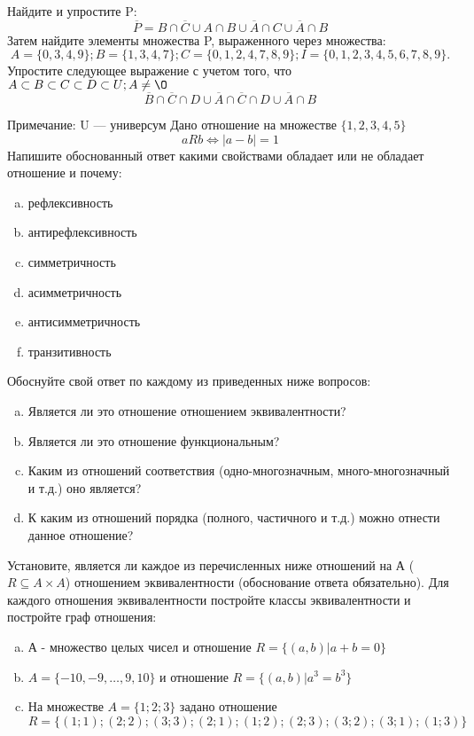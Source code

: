 \documentclass[10pt]{exam}
\begin{document}
\begin{questions}
\question
Найдите и упростите P:
\begin{equation*}
\overline{P} = B \cap \overline{C} \cup A \cap B \cup \overline{A} \cap C \cup \overline{A} \cap B
\end{equation*}
Затем найдите элементы множества P, выраженного через множества:
\begin{equation*}
A = \{0, 3, 4, 9\}; 
B = \{1, 3, 4, 7\};
C = \{0, 1, 2, 4, 7, 8, 9\};
I = \{0, 1, 2, 3, 4, 5, 6, 7, 8, 9\}.
\end{equation*}\question
Упростите следующее выражение с учетом того, что $A\subset B \subset C \subset D \subset U; A \neq \O$
\begin{equation*}
\overline{B} \cap \overline{C} \cap D \cup \overline{A} \cap \overline{C} \cap D \cup \overline{A} \cap B
\end{equation*}

Примечание: U — универсум\question
Дано отношение на множестве $\{1, 2, 3, 4, 5\}$ 
\begin{equation*}
aRb \iff |a-b| = 1
\end{equation*}
Напишите обоснованный ответ какими свойствами обладает или не обладает отношение и почему:   
\begin{enumerate} [a)]\setcounter{enumi}{0}
\item рефлексивность
\item антирефлексивность
\item симметричность
\item асимметричность
\item антисимметричность
\item транзитивность
\end{enumerate}

Обоснуйте свой ответ по каждому из приведенных ниже вопросов:
\begin{enumerate} [a)]\setcounter{enumi}{0}
    \item Является ли это отношение отношением эквивалентности?
    \item Является ли это отношение функциональным?
    \item Каким из отношений соответствия (одно-многозначным, много-многозначный и т.д.) оно является?
    \item К каким из отношений порядка (полного, частичного и т.д.) можно отнести данное отношение?
\end{enumerate}

\question
Установите, является ли каждое из перечисленных ниже отношений на А ($R \subseteq A \times A$) отношением эквивалентности (обоснование ответа обязательно). Для каждого отношения эквивалентности 
постройте классы эквивалентности и постройте граф отношения:
\begin{enumerate}[a)]\setcounter{enumi}{0}
\item А - множество целых чисел и отношение $R = \{(a,b)|a + b = 0\}$
\item $A = \{-10, -9, …, 9, 10\}$ и отношение $R = \{(a,b)|a^{3} = b^{3}\}$
\item На множестве $A = \{1; 2; 3\}$ задано отношение $R = \{(1; 1); (2; 2); (3; 3); (2; 1); (1; 2); (2; 3); (3; 2); (3; 1); (1; 3)\}$


\end{enumerate}
\end{questions}
\end{document}
